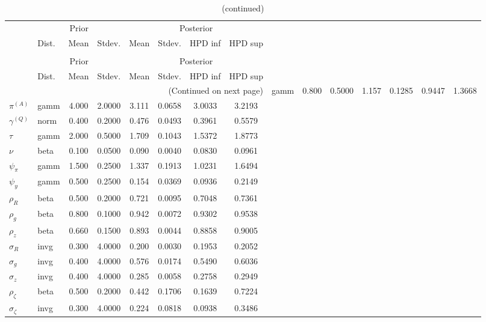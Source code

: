  
\begin{center}
\begin{longtable}{llcccccc} 
\caption{Results from Metropolis-Hastings (parameters)}
 \label{Table:MHPosterior:1}\\
\toprule 
  & \multicolumn{3}{c}{Prior}  &  \multicolumn{4}{c}{Posterior} \\
  \cmidrule(r{.75em}){2-4} \cmidrule(r{.75em}){5-8}
  & Dist. & Mean  & Stdev. & Mean & Stdev. & HPD inf & HPD sup\\
\midrule \endfirsthead 
\caption{(continued)}\\\toprule 
  & \multicolumn{3}{c}{Prior}  &  \multicolumn{4}{c}{Posterior} \\
  \cmidrule(r{.75em}){2-4} \cmidrule(r{.75em}){5-8}
  & Dist. & Mean  & Stdev. & Mean & Stdev. & HPD inf & HPD sup\\
\midrule \endhead 
\bottomrule \multicolumn{8}{r}{(Continued on next page)} \endfoot 
\bottomrule \endlastfoot 
${r_{A}}$ & gamm &   0.800 & 0.5000 &   1.157& 0.1285 &  0.9447 &  1.3668 \\ 
${\pi^{(A)}}$ & gamm &   4.000 & 2.0000 &   3.111& 0.0658 &  3.0033 &  3.2193 \\ 
${\gamma^{(Q)}}$ & norm &   0.400 & 0.2000 &   0.476& 0.0493 &  0.3961 &  0.5579 \\ 
${\tau}$ & gamm &   2.000 & 0.5000 &   1.709& 0.1043 &  1.5372 &  1.8773 \\ 
${\nu}$ & beta &   0.100 & 0.0500 &   0.090& 0.0040 &  0.0830 &  0.0961 \\ 
${\psi_\pi}$ & gamm &   1.500 & 0.2500 &   1.337& 0.1913 &  1.0231 &  1.6494 \\ 
${\psi_y}$ & gamm &   0.500 & 0.2500 &   0.154& 0.0369 &  0.0936 &  0.2149 \\ 
${\rho_R}$ & beta &   0.500 & 0.2000 &   0.721& 0.0095 &  0.7048 &  0.7361 \\ 
${\rho_{g}}$ & beta &   0.800 & 0.1000 &   0.942& 0.0072 &  0.9302 &  0.9538 \\ 
${\rho_z}$ & beta &   0.660 & 0.1500 &   0.893& 0.0044 &  0.8858 &  0.9005 \\ 
${\sigma_R}$ & invg &   0.300 & 4.0000 &   0.200& 0.0030 &  0.1953 &  0.2052 \\ 
${\sigma_{g}}$ & invg &   0.400 & 4.0000 &   0.576& 0.0174 &  0.5490 &  0.6036 \\ 
${\sigma_z}$ & invg &   0.400 & 4.0000 &   0.285& 0.0058 &  0.2758 &  0.2949 \\ 
${\rho_\zeta}$ & beta &   0.500 & 0.2000 &   0.442& 0.1706 &  0.1639 &  0.7224 \\ 
${\sigma_\zeta}$ & invg &   0.300 & 4.0000 &   0.224& 0.0818 &  0.0938 &  0.3486 \\ 
\end{longtable}
 \end{center}
